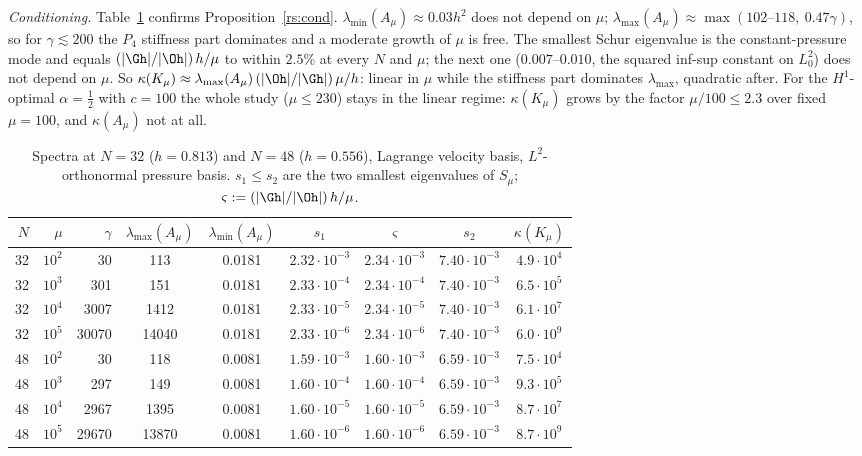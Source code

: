 \emph{Conditioning.} Table~\ref{rs:tab:cond} confirms Proposition~\ref{rs:cond}. $\lambda_{\min}(A_\mu)\approx0.03h^2$ does not depend on $\mu$; $\lambda_{\max}(A_\mu)\approx\max(102\text{--}118,\ 0.47\gamma)$, so for $\gamma\lesssim200$ the $P_4$ stiffness part dominates and a moderate growth of $\mu$ is free. The smallest Schur eigenvalue is the constant-pressure mode and equals $(|\Gh|/|\Oh|)\,h/\mu$ to within $2.5\%$ at every $N$ and $\mu$; the next one ($0.007$--$0.010$, the squared inf-sup constant on $L^2_0$) does not depend on $\mu$. So $\kappa(K_\mu)\approx\lambda_{\max}(A_\mu)\,(|\Oh|/|\Gh|)\,\mu/h$: linear in $\mu$ while the stiffness part dominates $\lambda_{\max}$, quadratic after. For the $H^1$-optimal $\alpha=\frac12$ with $c=100$ the whole study ($\mu\le230$) stays in the linear regime: $\kappa(K_\mu)$ grows by the factor $\mu/100\le2.3$ over fixed $\mu=100$, and $\kappa(A_\mu)$ not at all.

\begin{table}[h]
\centering\small
\caption{Spectra at $N=32$ ($h=0.813$) and $N=48$ ($h=0.556$), Lagrange velocity basis, $L^2$-orthonormal pressure basis. $s_1\le s_2$ are the two smallest eigenvalues of $S_\mu$; $\varsigma:=(|\Gh|/|\Oh|)\,h/\mu$.}\label{rs:tab:cond}
\begin{tabular}{rrrcccccc}
\toprule
$N$ & $\mu$ & $\gamma$ & $\lambda_{\max}(A_\mu)$ & $\lambda_{\min}(A_\mu)$ & $s_1$ & $\varsigma$ & $s_2$ & $\kappa(K_\mu)$\\
\midrule
32 & $10^2$ & 30 & 113 & 0.0181 & $2.32\cdot10^{-3}$ & $2.34\cdot10^{-3}$ & $7.40\cdot10^{-3}$ & $4.9\cdot10^4$\\
32 & $10^3$ & 301 & 151 & 0.0181 & $2.33\cdot10^{-4}$ & $2.34\cdot10^{-4}$ & $7.40\cdot10^{-3}$ & $6.5\cdot10^5$\\
32 & $10^4$ & 3007 & 1412 & 0.0181 & $2.33\cdot10^{-5}$ & $2.34\cdot10^{-5}$ & $7.40\cdot10^{-3}$ & $6.1\cdot10^7$\\
32 & $10^5$ & 30070 & 14040 & 0.0181 & $2.33\cdot10^{-6}$ & $2.34\cdot10^{-6}$ & $7.40\cdot10^{-3}$ & $6.0\cdot10^9$\\
48 & $10^2$ & 30 & 118 & 0.0081 & $1.59\cdot10^{-3}$ & $1.60\cdot10^{-3}$ & $6.59\cdot10^{-3}$ & $7.5\cdot10^4$\\
48 & $10^3$ & 297 & 149 & 0.0081 & $1.60\cdot10^{-4}$ & $1.60\cdot10^{-4}$ & $6.59\cdot10^{-3}$ & $9.3\cdot10^5$\\
48 & $10^4$ & 2967 & 1395 & 0.0081 & $1.60\cdot10^{-5}$ & $1.60\cdot10^{-5}$ & $6.59\cdot10^{-3}$ & $8.7\cdot10^7$\\
48 & $10^5$ & 29670 & 13870 & 0.0081 & $1.60\cdot10^{-6}$ & $1.60\cdot10^{-6}$ & $6.59\cdot10^{-3}$ & $8.7\cdot10^9$\\
\bottomrule
\end{tabular}
\end{table}

